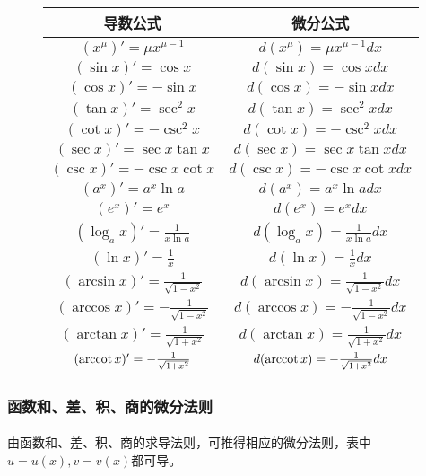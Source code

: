 \bgroup
\def\arraystretch{1.8}
\setlength\tabcolsep{1.8cm}
\begin{figure}[H]
\centering
  \begin{tabular}{c|c}
    \hline
    导数公式 & 微分公式 \\
    \hline
    $(x^\mu)' = \mu x^{\mu - 1}$ & $d(x^\mu) = \mu x^{\mu - 1}dx$ \\
    $(\sin{x})' = \cos{x}$ & $d(\sin{x}) = \cos{x}dx$ \\
    $(\cos{x})' = -\sin{x}$ & $d(\cos{x}) = -\sin{x}dx$ \\
    $(\tan{x})' = \sec^2{x}$ & $d(\tan{x}) = \sec^2{x}dx$ \\
    $(\cot{x})' = -\csc^2{x}$ & $d(\cot{x}) = -\csc^2{x}dx$ \\
    $(\sec{x})' = \sec{x}\tan{x}$ & $d(\sec{x}) = \sec{x}\tan{x}dx$ \\
    $(\csc{x})' = -\csc{x}\cot{x}$ & $d(\csc{x}) = -\csc{x}\cot{x}dx$ \\
    $(a^x)' = a^x\ln{a}$ & $d(a^x) = a^x\ln{a}dx$ \\
    $(e^x)' = e^x$ & $d(e^x) = e^xdx$ \\
    $(\log_a{x})' = \frac{1}{x\ln{a}}$ & $d(\log_a{x}) = \frac{1}{x\ln{a}}dx$ \\
    $(\ln{x})' = \frac{1}{x}$ & $d(\ln{x}) = \frac{1}{x}dx$ \\
    $(\arcsin{x})' = \frac{1}{\sqrt{1-x^2}}$ & $d(\arcsin{x}) = \frac{1}{\sqrt{1-x^2}}dx$ \\
    $(\arccos{x})' = -\frac{1}{\sqrt{1-x^2}}$ & $d(\arccos{x}) = -\frac{1}{\sqrt{1-x^2}}dx$ \\
    $(\arctan{x})' = \frac{1}{\sqrt{1+x^2}}$ & $d(\arctan{x}) = \frac{1}{\sqrt{1+x^2}}dx$ \\
    $(\operatorname{arccot}{x})' = -\frac{1}{\sqrt{1+x^2}}$ & $d(\operatorname{arccot}{x}) = -\frac{1}{\sqrt{1+x^2}}dx$ \\
    \hline
  \end{tabular}
\end{figure}
\egroup

\subsubsection{函数和、差、积、商的微分法则}
\paragraph{}
由函数和、差、积、商的求导法则，可推得相应的微分法则，表中$u = u(x), v = v(x)$都可导。

